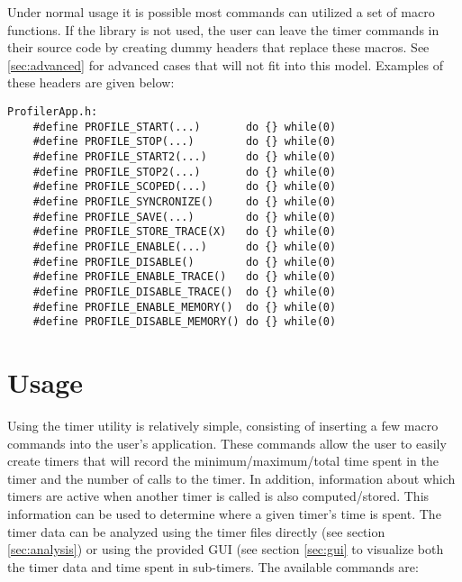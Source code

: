 \documentclass[fleqn,10pt,letterpaper]{article}
\begin{document}
Under normal usage it is possible most commands can utilized a set of macro 
functions.  If the library is not used, the user can leave the timer commands in
their source code by creating dummy headers that replace these macros.
See \ref{sec:advanced} for advanced cases that will not fit into this model.
Examples of these headers are given below: 
\begin{Verbatim}[baselinestretch=1.0]
ProfilerApp.h:
    #define PROFILE_START(...)       do {} while(0)
    #define PROFILE_STOP(...)        do {} while(0)
    #define PROFILE_START2(...)      do {} while(0)
    #define PROFILE_STOP2(...)       do {} while(0)
    #define PROFILE_SCOPED(...)      do {} while(0)
    #define PROFILE_SYNCRONIZE()     do {} while(0)
    #define PROFILE_SAVE(...)        do {} while(0)
    #define PROFILE_STORE_TRACE(X)   do {} while(0)
    #define PROFILE_ENABLE(...)      do {} while(0)
    #define PROFILE_DISABLE()        do {} while(0)
    #define PROFILE_ENABLE_TRACE()   do {} while(0)
    #define PROFILE_DISABLE_TRACE()  do {} while(0)
    #define PROFILE_ENABLE_MEMORY()  do {} while(0)
    #define PROFILE_DISABLE_MEMORY() do {} while(0)
\end{Verbatim}



\section{Usage}  \label{sec:usage}

Using the timer utility is relatively simple, consisting of inserting a few macro
commands into the user's application.  These commands allow the user to easily create
timers that will record the minimum/maximum/total time spent in the timer and the
number of calls to the timer.  In addition, information about which timers are 
active when another timer is called is also computed/stored.  This information
can be used to determine where a given timer's time is spent.  The timer data can be 
analyzed using the timer files directly (see section \ref{sec:analysis}) or using 
the provided GUI (see section \ref{sec:gui} to visualize both the timer data and 
time spent in sub-timers.  
The available commands are: \\
\end{document}
